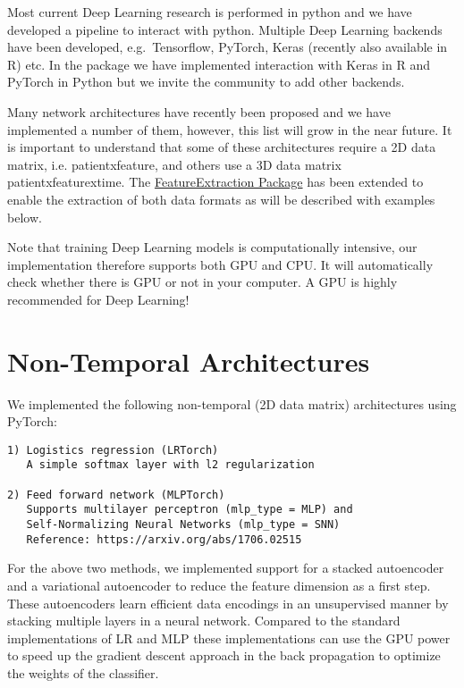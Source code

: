 \documentclass[]{article}
\begin{document}
Most current Deep Learning research is performed in python and we have
developed a pipeline to interact with python. Multiple Deep Learning
backends have been developed, e.g.~Tensorflow, PyTorch, Keras (recently
also available in R) etc. In the package we have implemented interaction
with Keras in R and PyTorch in Python but we invite the community to add
other backends.

Many network architectures have recently been proposed and we have
implemented a number of them, however, this list will grow in the near
future. It is important to understand that some of these architectures
require a 2D data matrix, i.e.
\textbar{}patient\textbar{}x\textbar{}feature\textbar{}, and others use
a 3D data matrix
\textbar{}patient\textbar{}x\textbar{}feature\textbar{}x\textbar{}time\textbar{}.
The \href{www.github.com/ohdsi/FeatureExtraction}{FeatureExtraction
Package} has been extended to enable the extraction of both data formats
as will be described with examples below.

Note that training Deep Learning models is computationally intensive,
our implementation therefore supports both GPU and CPU. It will
automatically check whether there is GPU or not in your computer. A GPU
is highly recommended for Deep Learning!

\section{Non-Temporal Architectures}\label{non-temporal-architectures}

We implemented the following non-temporal (2D data matrix) architectures
using PyTorch:

\begin{verbatim}
1) Logistics regression (LRTorch)
   A simple softmax layer with l2 regularization

2) Feed forward network (MLPTorch) 
   Supports multilayer perceptron (mlp_type = MLP) and 
   Self-Normalizing Neural Networks (mlp_type = SNN)
   Reference: https://arxiv.org/abs/1706.02515
\end{verbatim}

For the above two methods, we implemented support for a stacked
autoencoder and a variational autoencoder to reduce the feature
dimension as a first step. These autoencoders learn efficient data
encodings in an unsupervised manner by stacking multiple layers in a
neural network. Compared to the standard implementations of LR and MLP
these implementations can use the GPU power to speed up the gradient
descent approach in the back propagation to optimize the weights of the
classifier.
\end{document}
